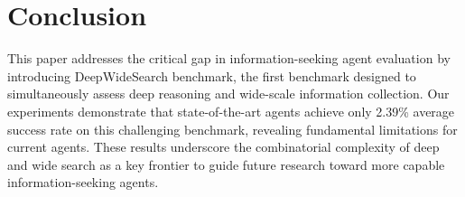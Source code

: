 \documentclass[11pt, letterpaper, logo, onecolumn, copyright, numbering]{paper_improved}
\begin{document}

\section{Conclusion}

This paper addresses the critical gap in information-seeking agent evaluation by introducing DeepWideSearch benchmark, the first benchmark designed to simultaneously assess deep reasoning and wide-scale information collection. Our experiments demonstrate that state-of-the-art agents achieve only 2.39\% average success rate on this challenging benchmark, revealing fundamental limitations for current agents. These results underscore the combinatorial complexity of deep and wide search as a key frontier to guide future research toward more capable information-seeking agents.
\end{document}
